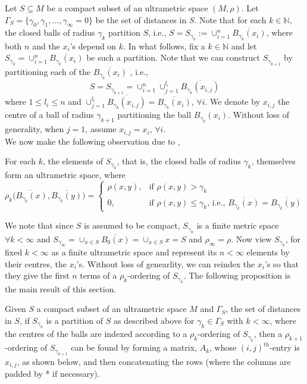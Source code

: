 Let $S \subseteq M$ be a compact subset of an ultrametric space $(M, \rho)$. Let $\Gamma_S =\{\gamma_0, \gamma_1,\ldots,\gamma_\infty=0\}$ be the set of distances in $S$.  Note that for each $k \in \mathbb{N}$, the closed balls of radius $\gamma_k$ partition $S$, i.e., $S=S_{\gamma_k} := \cup_{i=1}^n \overline{B_{\gamma_k}(x_i)}$, where both $n$ and the $x_i$'s depend on $k$. In what follows, fix a $k \in \mathbb{N}$ and let $S_{\gamma_k} = \cup_{i=1}^n \overline{B_{\gamma_k}(x_i)}$ be such a partition. Note that we can construct $S_{\gamma_{k+1}}$ by partitioning each of the $\overline{B_{\gamma_k}(x_i)}$ , i.e., \[S = S_{\gamma_{k+1}} = \cup_{i=1}^n \cup_{j=1}^{l_i} \overline{B_{\gamma_k}(x_{i,j})}\] where $1 \leq l_i \leq n$ and $\cup_{j=1}^{l_i} \overline{B_{\gamma_k}(x_{i,j})}=\overline{B_{\gamma_k}(x_i)}$, $\forall i$. We denote by $x_{i,j}$ the centre of a ball of radius $\gamma_{k+1}$ partitioning the ball $B_{\gamma_k}(x_i)$. Without loss of generality, when $j=1$, assume $x_{i,j}=x_i$, $\forall i$.\\

We now make the following observation due to \cite{na},

\begin{lemma*}
For each $k$, the elements of $S_{\gamma_k}$, that is, the closed balls of radius $\gamma_k$, themselves form an ultrametric space, where 
\[ \rho_k\overline{(B_{\gamma_k}(x)},\overline{B_{\gamma_k}(y)}) = 
\begin{cases}
\rho(x,y), & \text{if } \rho(x,y) > \gamma_k \\
0, & \text{if }   \rho(x,y) \leq \gamma_k \text{, i.e., } \overline{B_{\gamma_k}(x)}=\overline{B_{\gamma_k}(y)}
\end{cases}
\]
\end{lemma*}

We note that since $S$ is assumed to be compact,  $S_{\gamma_k}$ is a finite metric space $\forall k < \infty$ and $S_{\gamma_\infty}=\cup_{x \in S}\overline{B_0(x)} = \cup_{x \in S}x=S$ and $\rho_\infty=\rho$.  Now view $S_{\gamma_k}$, for fixed $k < \infty$ as a finite ultrametric space and represent its $n < \infty$ elements by their centres, the $x_i$'s. Without loss of genearlity, we can reindex the $x_i$'s so that they give the first $n$ terms of a $\rho_k$-ordering of $S_{\gamma_k}$. The following proposition is the main result of this section.

\begin{proposition*}
Given $S$ a compact subset of an ultrametric space $M$ and $\Gamma_S$, the set of distances in $S$, if $S_{\gamma_k}$ is a partition of $S$ as described above for $\gamma_k \in \Gamma_S$ with $k < \infty$, where the centres of the balls are indexed according to a $\rho_k$-ordering of $S_{\gamma_k}$, then a $\rho_{k+1}$-ordering of $S_{\gamma_{k+1}}$ can be found by forming a matrix, $A_k$, whose $(i,j)^{th}$-entry is $x_{i,j}$, as shown below, and then concatenating the rows (where the columns are padded by * if necessary). 
\end{proposition*}


